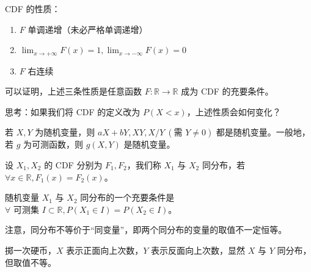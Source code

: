 \documentclass[../main.tex]{subfiles}
\begin{document}
\begin{proposition}
CDF 的性质：
\begin{enumerate}
    \item $F$ 单调递增（未必严格单调递增）
    \item $\lim_{x\rightarrow+\infty}F(x)=1,\lim_{x\rightarrow-\infty}F(x)=0$
    \item $F$ 右连续
\end{enumerate}
\end{proposition}

可以证明，上述三条性质是任意函数 $F:\mathbb{R}\rightarrow\mathbb{R}$ 成为 CDF 的充要条件。

思考：如果我们将 CDF 的定义改为 $P(X<x)$，上述性质会如何变化？

\begin{proposition}
若 $X,Y$ 为随机变量，则 $aX+bY,XY,X/Y\ (\text{需 }Y\neq 0)$ 都是随机变量。一般地，若 $g$ 为可测函数，则 $g(X,Y)$ 是随机变量。
\end{proposition}

\begin{definition}\label{def:2.1.4}
设 $X_1,X_2$ 的 CDF 分别为 $F_1,F_2$，我们称 $X_1$ 与 $X_2$ 同分布，若 $\forall x\in\mathbb{R},F_1(x)=F_2(x)$。
\end{definition}

\begin{proposition}
随机变量 $X_1$ 与 $X_2$ 同分布的一个充要条件是 $\forall \text{ 可测集 }I\subset\mathbb{R},P(X_1\in I)=P(X_2\in I)$。
\end{proposition}

注意，同分布不等价于“同变量”，即两个同分布的变量的取值不一定恒等。

\begin{example}
掷一次硬币，$X$ 表示正面向上次数，$Y$ 表示反面向上次数，显然 $X$ 与 $Y$ 同分布，但取值不等。
\end{example}
\end{document}
